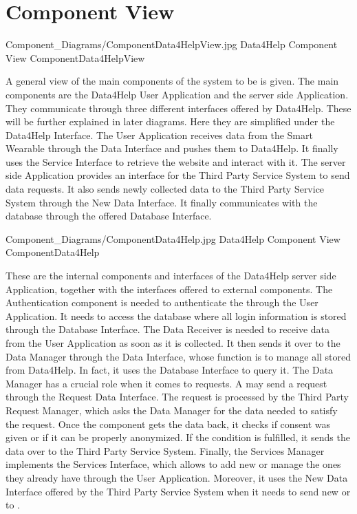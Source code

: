 \documentclass[../../DD.tex]{subfiles}
\begin{document}
\section{Component View}

	\image {13cm} {Component_Diagrams/ComponentData4HelpView.jpg} {Data4Help Component View} {ComponentData4HelpView}

	A general view of the main components of the system to be is given. The main components are the Data4Help User Application and the server side Application. They communicate through three different interfaces offered by Data4Help. These will be further explained in later diagrams. Here they are simplified under the Data4Help Interface. The User Application receives data from the Smart Wearable through the Data Interface and pushes them to Data4Help. It finally uses the Service Interface to retrieve the  website and interact with it.
	The server side Application provides an interface for the Third Party Service System to send data requests. It also sends newly collected data to the Third Party Service System through the New Data Interface. It finally communicates with the database through the offered Database Interface.

	\image {13cm} {Component_Diagrams/ComponentData4Help.jpg} {Data4Help Component View} {ComponentData4Help}

	These are the internal components and interfaces of the Data4Help server side Application, together with the interfaces offered to external components.
	The Authentication component is needed to authenticate the  through the User Application. It needs to access the database where all login information is stored through the Database Interface.
	The Data Receiver is needed to receive data from the User Application as soon as it is collected. It then sends it over to the Data Manager through the Data Interface, whose function is to manage all  stored from Data4Help. In fact, it uses the Database Interface to query it.
	The Data Manager has a crucial role when it comes to  requests. A  may send a request through the Request Data Interface. The request is processed by the Third Party Request Manager, which asks the Data Manager for the data needed to satisfy the request. Once the component gets the data back, it checks if  consent was given or if it can be properly anonymized. If the condition is fulfilled, it sends the data over to the Third Party Service System.
	Finally, the Services Manager implements the Services Interface, which allows  to add new  or manage the ones they already have through the User Application. Moreover, it uses the New Data Interface offered by the Third Party Service System when it needs to send new  or  to .
\end{document}
